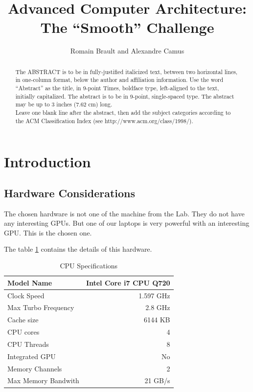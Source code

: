 \documentclass{egpubl}
\title[ACA: The ``Smooth'' Challenge]{Advanced Computer Architecture: The ``Smooth'' Challenge}
\author[R. Brault \& A. Camus]{Romain Brault and Alexandre Camus}
\begin{document}


\maketitle

\begin{abstract}
   The ABSTRACT is to be in fully-justified italicized text, 
   between two horizontal lines,
   in one-column format, 
   below the author and affiliation information. 
   Use the word ``Abstract'' as the title, in 9-point Times, boldface type, 
   left-aligned to the text, initially capitalized. 
   The abstract is to be in 9-point, single-spaced type.
   The abstract may be up to 3 inches (7.62 cm) long. \\
   Leave one blank line after the abstract, 
   then add the subject categories according to the ACM Classification Index 
   (see http://www.acm.org/class/1998/).

\end{abstract}




\section{Introduction}


\subsection{Hardware Considerations}

The chosen hardware is not one of the machine from the Lab. They do not have any interesting GPUs. But one of our laptops is very powerful with an interesting GPU. This is the chosen one.

The table \ref{CPUspec} contains the details of this hardware.
\begin{table}[h]
\centering
\begin{tabular}{|l|r|}
\hline
Model Name & Intel Core i7 CPU Q720 \\
\hline
Clock Speed & 1.597 GHz \\
\hline
Max Turbo Frequency & 2.8 GHz \\
\hline
Cache size & 6144 KB \\
\hline
CPU cores & 4 \\
\hline
CPU Threads & 8 \\
\hline
Integrated GPU & No \\
\hline
Memory Channels & 2 \\
\hline
Max Memory Bandwith & 21 GB/s \\
\hline
\end{tabular}
\caption{CPU Specifications}
\label{CPUspec}
\end{table}
\end{document}
